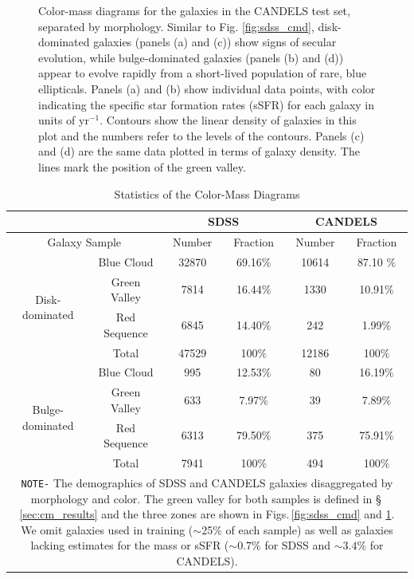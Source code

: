 \begin{figure}[htbp]
\begin{center}
\begin{tabular}{ll}
    \end{tabular}
  \end{center}
  \caption{Color-mass diagrams for the galaxies in the CANDELS test set, separated by morphology. Similar to Fig. \ref{fig:sdss_cmd}, disk-dominated galaxies (panels (a) and (c)) show signs of secular evolution, while bulge-dominated galaxies (panels (b) and (d)) appear to evolve rapidly from a short-lived population of rare, blue ellipticals. Panels (a) and (b) show individual data points, with color indicating the specific star formation rates (sSFR) for each galaxy in units of yr$^{-1}$. Contours show the linear density of galaxies in this plot and the numbers refer to the levels of the contours. Panels (c) and (d) are the same data plotted in terms of galaxy density. The lines mark the position of the green valley.}
  \label{fig:candels_cmd}
\end{figure}

\begin{table}[htbp]
  \centering
  \caption{Statistics of the Color-Mass Diagrams \label{tab:cmd_stats}}
  \begin{tabular}{c|c|cc|cc}
      \hline
      \hline
      \multicolumn{2}{c}{} & \multicolumn{2}{|c|}{SDSS} & \multicolumn{2}{c}{CANDELS}\\ 
      \hline
      \multicolumn{2}{c|}{Galaxy Sample} & Number & Fraction & Number & Fraction\\
      \hline
      \multirow{4}{*}{Disk-dominated} & Blue Cloud & 32870 & 69.16$\%$ & 10614 & 87.10 $\%$ \\ & Green Valley & 7814 & 16.44$\%$ & 1330 & 10.91$\%$ \\ & Red Sequence & 6845 & 14.40$\%$ & 242 & 1.99$\%$ \\ \cline{2-6}
      & Total & 47529 & 100$\%$ & 12186 & 100$\%$ \\ 
      \hline
      \hline
      \multirow{4}{*}{Bulge-dominated} & Blue Cloud & 995 & 12.53$\%$ & 80 & 16.19$\%$ \\ & Green Valley & 633 & 7.97$\%$ & 39 & 7.89$\%$ \\ & Red Sequence & 6313 & 79.50$\%$ & 375 & 75.91$\%$ \\ \cline{2-6}
      & Total & 7941 & 100$\%$ & 494 & 100$\%$ \\
      \hline 
      \multicolumn{6}{p{0.82\textwidth}}{\vskip 0.01cm \small \texttt{NOTE-} The demographics of SDSS and CANDELS galaxies disaggregated by morphology and color. The green valley for both samples is defined in \S\,\ref{sec:cm_results} and the three zones are shown in Figs.\,\ref{fig:sdss_cmd} and \ref{fig:candels_cmd}. We omit galaxies used in training \gamornet{} ($\sim$25\% of each sample) as well as galaxies lacking estimates for the mass or sSFR ($\sim 0.7\%$ for SDSS and $\sim 3.4\%$ for CANDELS).}
  \end{tabular}
  \end{table}

